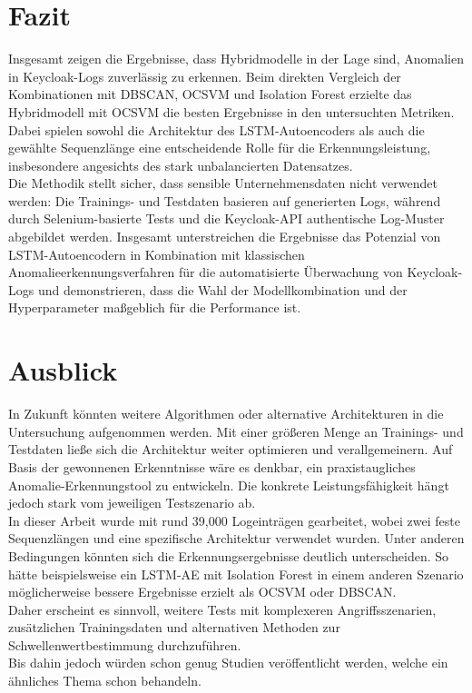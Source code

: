 \documentclass[a4paper,12pt]{article}
\begin{document}
	\section{Fazit}
	Insgesamt zeigen die Ergebnisse, dass Hybridmodelle in der Lage sind, Anomalien in Keycloak-Logs zuverlässig zu erkennen. Beim direkten Vergleich der Kombinationen mit DBSCAN, OCSVM und Isolation Forest erzielte das Hybridmodell mit OCSVM die besten Ergebnisse in den untersuchten Metriken. Dabei spielen sowohl die Architektur des LSTM-Autoencoders als auch die gewählte Sequenzlänge eine entscheidende Rolle für die Erkennungsleistung, insbesondere angesichts des stark unbalancierten Datensatzes.
	\\[0.5em]
	Die Methodik stellt sicher, dass sensible Unternehmensdaten nicht verwendet werden: Die Trainings- und Testdaten basieren auf generierten Logs, während durch Selenium-basierte Tests und die Keycloak-API authentische Log-Muster abgebildet werden. Insgesamt unterstreichen die Ergebnisse das Potenzial von LSTM-Autoencodern in Kombination mit klassischen Anomalieerkennungsverfahren für die automatisierte Überwachung von Keycloak-Logs und demonstrieren, dass die Wahl der Modellkombination und der Hyperparameter maßgeblich für die Performance ist.
		
	\section{Ausblick}
	In Zukunft könnten weitere Algorithmen oder alternative Architekturen in die Untersuchung aufgenommen werden. Mit einer größeren Menge an Trainings- und Testdaten ließe sich die Architektur weiter optimieren und verallgemeinern. Auf Basis der gewonnenen Erkenntnisse wäre es denkbar, ein praxistaugliches Anomalie-Erkennungstool zu entwickeln. Die konkrete Leistungsfähigkeit hängt jedoch stark vom jeweiligen Testszenario ab.  
	\\[0.5em]
	In dieser Arbeit wurde mit rund 39{,}000 Logeinträgen gearbeitet, wobei zwei feste Sequenzlängen und eine spezifische Architektur verwendet wurden. Unter anderen Bedingungen könnten sich die Erkennungsergebnisse deutlich unterscheiden. So hätte beispielsweise ein LSTM-AE mit Isolation Forest in einem anderen Szenario möglicherweise bessere Ergebnisse erzielt als OCSVM oder DBSCAN.  
	\\[0.5em]
	Daher erscheint es sinnvoll, weitere Tests mit komplexeren Angriffsszenarien, zusätzlichen Trainingsdaten und alternativen Methoden zur Schwellenwertbestimmung durchzuführen.
	\\[0.5em]
	Bis dahin jedoch würden schon genug Studien veröffentlicht werden, welche ein ähnliches Thema schon behandeln.
	
\newpage	
 
\newpage 
\renewcommand{\notesname}{Fußnotenverzeichnis}
\renewcommand{\enoteformat}{\rightskip0pt\leftskip0pt\vspace{0.5em}\noindent\makebox[2em][l]{\theenmark}}
\theendnotes
\newpage
\end{document}
